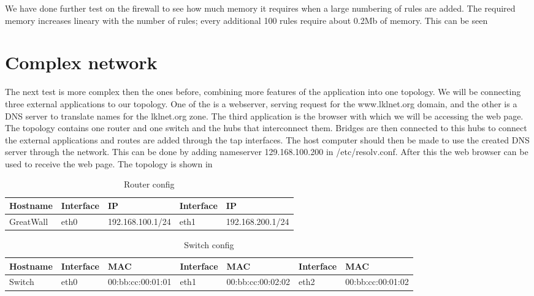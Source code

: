 We have done further test on the firewall to see how much memory it requires when a large numbering
of rules are added. The required memory increases lineary with the number of rules; every additional
100 rules require about 0.2Mb of memory. This can be seen 

\section{Complex network}
\label{sec:complex-network}

The next test is more complex then the ones before, combining more features of the application into
one topology. We will be connecting three external applications to our \textbf{\project} topology. One of
the is a webserver, serving request for the www.lklnet.org domain, and the other is a DNS server to
translate names for the lklnet.org zone. The third application is the browser with which we will
be accessing the web page. The \textbf{\project} topology contains one router and one switch and the hubs
that interconnect them. Bridges are then connected to this hubs to connect the external applications and
routes are added through the tap interfaces. The host computer should then be made to use the created
DNS server through the \textbf{\project} network. This can be done by adding nameserver 129.168.100.200
in /etc/resolv.conf. After this the web browser can be used to receive the web page. The topology is shown
in 

\begin{center}
  \begin{table}[htb]
  \begin{center}
  \begin{tabular}{| l | l | l | l | l |}
    \hline
      Hostname & Interface & IP & Interface & IP \\ \hline
      GreatWall & eth0 & 192.168.100.1/24 & eth1 & 192.168.200.1/24 \\ 
    \hline
  \end{tabular}
  \end{center}
  \caption{Router config}
  \label{table:complex-router}
  \end{table}
\end{center}

\begin{center}
  \begin{table}[htb]
  \begin{center}
  \begin{tabular}{| l | l | l | l | l | l | l |}
    \hline
      Hostname & Interface & MAC & Interface & MAC & Interface & MAC \\ \hline
      Switch & eth0 & 00:bb:cc:00:01:01 & eth1 & 00:bb:cc:00:02:02 & eth2 & 00:bb:cc:00:01:02 \\
    \hline
  \end{tabular}
  \end{center}
  \caption{Switch config}
  \label{table:complex-switch}
  \end{table}
\end{center}


